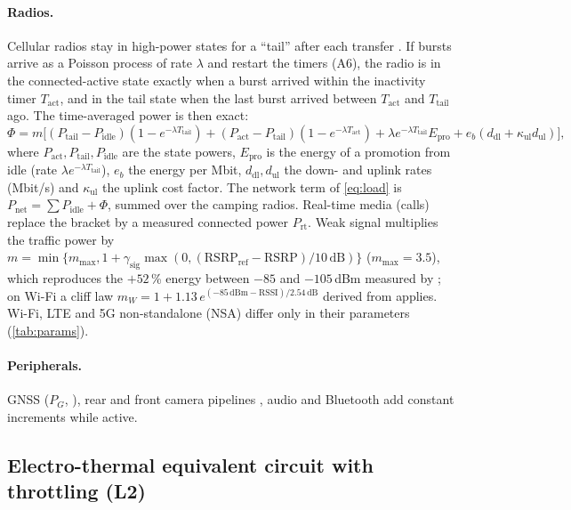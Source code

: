 \paragraph{Radios.} Cellular radios stay in high-power states for a ``tail'' after each transfer
\cite{HU12,NA21}. If bursts arrive as a Poisson process of rate $\lambda$ and restart the timers (A6), the radio
is in the connected-active state exactly when a burst arrived within the inactivity timer $T_{\mathrm{act}}$,
and in the tail state when the last burst arrived between $T_{\mathrm{act}}$ and $T_{\mathrm{tail}}$ ago. The
time-averaged power is then exact:
\begin{equation}
  \Phi=m\Big[(P_{\mathrm{tail}}-P_{\mathrm{idle}})(1-e^{-\lambda T_{\mathrm{tail}}})+(P_{\mathrm{act}}-P_{\mathrm{tail}})(1-e^{-\lambda T_{\mathrm{act}}})
  +\lambda e^{-\lambda T_{\mathrm{tail}}}E_{\mathrm{pro}}+e_b(d_{\mathrm{dl}}+\kappa_{\mathrm{ul}}d_{\mathrm{ul}})\Big], \label{eq:radio}
\end{equation}
where $P_{\mathrm{act}},P_{\mathrm{tail}},P_{\mathrm{idle}}$ are the state powers, $E_{\mathrm{pro}}$ is the energy of
a promotion from idle (rate $\lambda e^{-\lambda T_{\mathrm{tail}}}$), $e_b$ the energy per Mbit,
$d_{\mathrm{dl}},d_{\mathrm{ul}}$ the down- and uplink rates (Mbit/s) and $\kappa_{\mathrm{ul}}$ the uplink cost
factor. The network term of \cref{eq:load} is $P_{\mathrm{net}}=\sum P_{\mathrm{idle}}+\Phi$, summed over the
camping radios. Real-time media (calls) replace the bracket by a measured connected power $P_{\mathrm{rt}}$. Weak
signal multiplies the traffic power by
$m=\min\{m_{\max},1+\gamma_{\mathrm{sig}}\max(0,\allowbreak(\mathrm{RSRP_{ref}}-\mathrm{RSRP})/10\,\mathrm{dB})\}$
($m_{\max}=3.5$), which reproduces the $+52$\,\% energy between $-85$ and $-105$\,dBm measured by \cite{DI13}; on
Wi-Fi a cliff law $m_W=1+1.13\,e^{(-85\,\mathrm{dBm}-\mathrm{RSSI})/2.54\,\mathrm{dB}}$ derived from \cite{DI13}
applies. Wi-Fi, LTE and 5G non-standalone (NSA) differ only in their parameters (\cref{tab:params}).

\paragraph{Peripherals.} GNSS ($P_G$, \cite{KW19}), rear and front camera pipelines \cite{CX13}, audio and
Bluetooth \cite{CH10} add constant increments while active.

\subsection{Electro-thermal equivalent circuit with throttling (L2)}\label{sec:L2}
